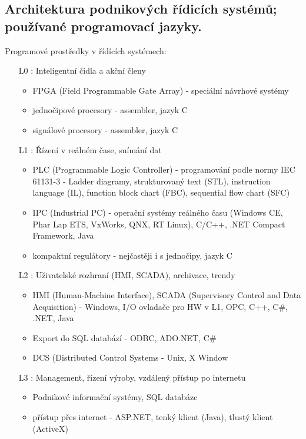 \subsection{Architektura podnikových řídicích systémů; používané programovací jazyky.}
Programové prostředky v řídících systémech:
\begin{itemize}
\item[L0]: Inteligentní čidla a akční členy
\begin{itemize}
\item FPGA (Field Programmable Gate Array) - speciální návrhové systémy
\item jednočipové procesory - assembler, jazyk C
\item signálové procesory - assembler, jazyk C
\end{itemize}
\item[L1]: Řízení v reálném čase, snímání dat
\begin{itemize}
\item PLC (Programmable Logic Controller) - programování podle normy IEC 61131-3 - Ladder diagramy, strukturovaný text (STL), instruction language (IL), function block chart (FBC), sequential flow chart (SFC)
\item IPC (Industrial PC) - operační systémy reálného času (Windows CE, Phar Lap ETS, VxWorks, QNX, RT Linux), C/C++, .NET Compact Framework, Java
\item kompaktní regulátory - nejčastěji i s jednočipy, jazyk C
\end{itemize}
\item[L2]: Uživatelské rozhraní (HMI, SCADA), archivace, trendy
\begin{itemize}
\item HMI (Human-Machine Interface), SCADA (Supervisory Control and Data Acquisition) - Windows, I/O ovladače pro HW v L1, OPC, C++, C\#, .NET, Java
\item Export do SQL databází - ODBC, ADO.NET, C\#
\item DCS (Distributed Control Systems - Unix, X Window
\end{itemize}
\item[L3]: Management, řízení výroby, vzdálený přístup po internetu
\begin{itemize}
\item Podnikové informační systémy, SQL databáze
\item přístup přes internet - ASP.NET, tenký klient (Java), tlustý klient (ActiveX)
\end{itemize}
\end{itemize}
